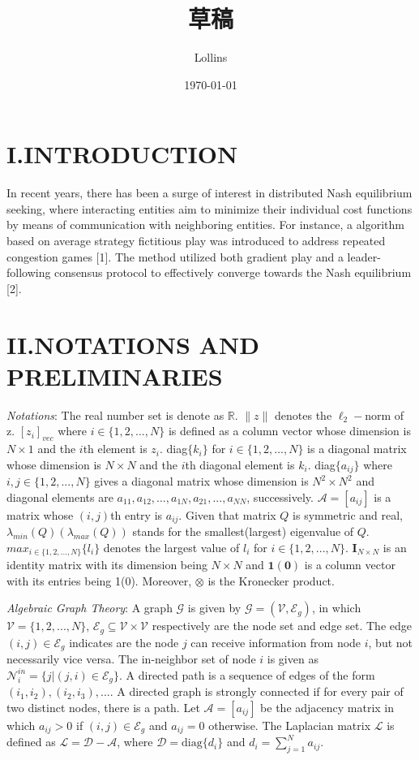\documentclass[12pt, a4paper, oneside]{ctexbook}
\title{{\Huge{\textbf{草稿}}}}
\author{Lollins}
\date{\today}
\begin{document}
\setcounter{page}{1}

\setcounter{page}{1}

\section*{I.\quad INTRODUCTION}
In recent years, there has been a surge of interest in distributed Nash equilibrium seeking, where interacting entities aim to minimize their individual cost functions by means of communication with neighboring entities.
For instance, a algorithm based on average strategy fictitious play was introduced to address repeated congestion games [1].
The method utilized both gradient play and a leader-following consensus protocol to effectively converge towards the Nash equilibrium [2].


\section*{II.\quad NOTATIONS AND PRELIMINARIES}
\emph{Notations}: The real number set is denote as $\mathbb{R}$. $\|z\|$ denotes the $\ell_2-$norm of z. $[z_i]_{vec}$ where $i \in \{1,2,...,N\}$ is defined as a column vector whose dimension is $N \times 1$ and the $i$th element is $z_i$. diag$\{k_i\}$ for $i \in \{1,2,...,N\}$ is a diagonal matrix whose dimension is $N\times N$ and the $i$th diagonal element is $k_i$. diag$\{a_{ij}\}$ where $i,j \in \{1,2,...,N\}$ gives a diagonal matrix whose dimension is $N^2 \times N^2$ and diagonal elements are $a_{11},a_{12},...,a_{1N},a_{21},...,a_{NN}$, successively. $\mathcal{A} = [a_{ij}]$ is a matrix whose $(i,j)$th entry is $a_{ij}$. Given that matrix $Q$ is symmetric and real, $\lambda_{min}(Q)(\lambda_{max}(Q))$ stands for the smallest(largest) eigenvalue of $Q$. $max_{i \in \{1,2,...,N\}}\{l_i\}$ denotes the largest value of $l_i$ for $i \in \{1,2,...,N\}$. $\mathbf{I}_{N \times N}$ is an identity matrix with its dimension being $N \times N$ and $\mathbf{1}(\mathbf{0})$ is a column vector with its entries being 1(0). Moreover, $\otimes$ is the Kronecker product.

\emph{Algebraic Graph Theory}: A graph $\mathcal{G}$ is given by $\mathcal{G} = (\mathcal{V},\mathcal{E}_g)$, in which $\mathcal{V} = \{1,2,...,N\}$, $\mathcal{E}_g \subseteq \mathcal{V}\times\mathcal{V}$ respectively are the node set and edge set. The edge $(i,j) \in \mathcal{E}_g$ indicates are the node $j$ can receive information from node $i$, but not necessarily vice versa. The in-neighbor set of node $i$ is given as $\mathcal{N}_{i}^{in}=\{j|(j,i)\in\mathcal{E}_{g}\}$. A directed path is a sequence of edges of the form $(i_1,i_2), (i_2,i_3),....$ A directed graph is strongly connected if for every pair of two distinct nodes, there is a path. Let $\mathcal{A} = [a_{ij}]$ be the adjacency matrix in which $a_{ij} > 0$ if $(i,j) \in \mathcal{E}_g$ and $a_{ij} = 0$ otherwise. The Laplacian matrix $\mathcal{L}$ is defined as $\mathcal{L} = \mathcal{D} - \mathcal{A}$, where $\mathcal{D} = \text{diag}\{d_i\}$ and $d_i = \sum_{j=1}^{N}a_{ij}$.
\end{document}
